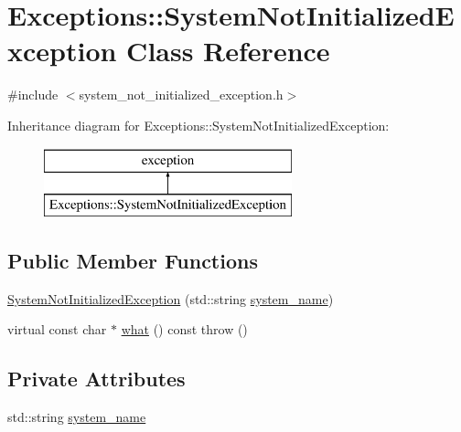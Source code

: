 \hypertarget{class_exceptions_1_1_system_not_initialized_exception}{}\section{Exceptions\+:\+:System\+Not\+Initialized\+Exception Class Reference}
\label{class_exceptions_1_1_system_not_initialized_exception}


{\ttfamily \#include $<$system\+\_\+not\+\_\+initialized\+\_\+exception.\+h$>$}

Inheritance diagram for Exceptions\+:\+:System\+Not\+Initialized\+Exception\+:\begin{figure}[H]
\begin{center}
\leavevmode
\includegraphics[height=2.000000cm]{class_exceptions_1_1_system_not_initialized_exception}
\end{center}
\end{figure}
\subsection*{Public Member Functions}
\begin{DoxyCompactItemize}
\item 
\hyperlink{class_exceptions_1_1_system_not_initialized_exception_ac22625946ad8f784f8c78b1b5b2970d7}{System\+Not\+Initialized\+Exception} (std\+::string \hyperlink{class_exceptions_1_1_system_not_initialized_exception_a5649bbb869394d52f7c8aa82d600d070}{system\+\_\+name})
\item 
virtual const char $\ast$ \hyperlink{class_exceptions_1_1_system_not_initialized_exception_a6481e3f2f2dd245e47ed246b12ce61c5}{what} () const   throw ()
\end{DoxyCompactItemize}
\subsection*{Private Attributes}
\begin{DoxyCompactItemize}
\item 
std\+::string \hyperlink{class_exceptions_1_1_system_not_initialized_exception_a5649bbb869394d52f7c8aa82d600d070}{system\+\_\+name}
\end{DoxyCompactItemize}


